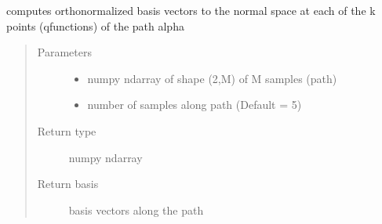\documentclass[letterpaper,10pt,english]{sphinxmanual}
\begin{document}
\begin{fulllineitems}
\label{\detokenize{geodesic:geodesic.find_basis_normal_path}}
computes orthonormalized basis vectors to the normal space at each of the
k points (q\sphinxhyphen{}functions) of the path alpha
\begin{quote}\begin{description}
\item[{Parameters}] \leavevmode\begin{itemize}
\item {} 
 \textendash{} numpy ndarray of shape (2,M) of M samples (path)

\item {} 
 \textendash{} number of samples along path (Default = 5)

\end{itemize}

\item[{Return type}] \leavevmode
numpy ndarray

\item[{Return basis}] \leavevmode
basis vectors along the path

\end{description}\end{quote}

\end{fulllineitems}

\end{document}
